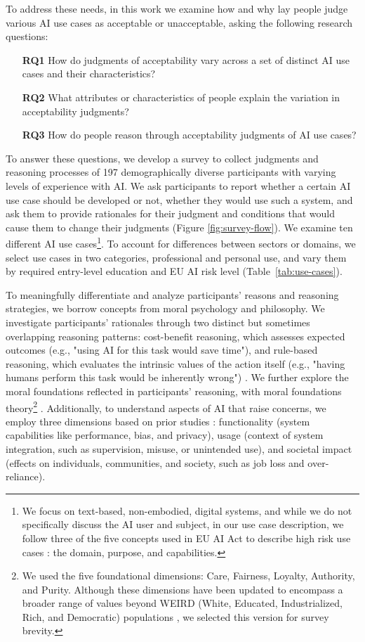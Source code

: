 To address these needs, in this work we examine how and why lay people judge various AI use cases as acceptable or unacceptable, asking the following research questions:
\begin{enumerate}
    \item [\textbf{RQ1}] How do judgments of acceptability vary across a set of distinct AI use cases and their characteristics?
    \item [\textbf{RQ2}] What attributes or characteristics of people explain the variation in acceptability judgments? 
    \item [\textbf{RQ3}] How do people reason through acceptability judgments of AI use cases?
\end{enumerate}
To answer these questions, we develop a survey to collect judgments and reasoning processes of 197 demographically diverse participants with varying levels of experience with AI. We ask participants to report whether a certain AI use case should be developed or not, whether they would use such a system, and ask them to provide rationales for their judgment and conditions that would cause them to change their judgments (Figure \ref{fig:survey-flow}). We examine ten different AI use cases\footnote{We focus on text-based, non-embodied, digital systems, and while we do not specifically discuss the AI user and subject, in our use case description, we follow three of the five concepts used in EU AI Act to describe high risk use cases \citep{golpayegani2023risk}: the domain, purpose, and capabilities.}. To account for differences between sectors or domains, we select use cases in two categories, professional and personal use, and vary them by required entry-level education and EU AI risk level (Table~\ref{tab:use-cases}).

To meaningfully differentiate and analyze participants' reasons and reasoning strategies, we borrow concepts from moral psychology and philosophy. We investigate participants' rationales through two distinct but sometimes overlapping reasoning patterns: cost-benefit reasoning, which assesses expected outcomes (e.g., "using AI for this task would save time"), and rule-based reasoning, which evaluates the intrinsic values of the action itself (e.g., "having humans perform this task would be inherently wrong") \citep{cushman2013action,cheung2024measuring}. We further explore the moral foundations reflected in participants' reasoning, with moral foundations theory\footnote{We used the five foundational dimensions: Care, Fairness, Loyalty, Authority, and Purity. Although these dimensions have been updated to encompass a broader range of values beyond WEIRD (White, Educated, Industrialized, Rich, and Democratic) populations \citep{atari2023morality}, we selected this version for survey brevity.} \citep{graham2011mapping,graham2008moral}. Additionally, to understand aspects of AI that raise concerns, we employ three dimensions based on prior studies \citep{solaiman2023evaluating,mun2024participaidemocraticsurveyingframework}: functionality (system capabilities like performance, bias, and privacy), usage (context of system integration, such as supervision, misuse, or unintended use), and societal impact (effects on individuals, communities, and society, such as job loss and over-reliance).

